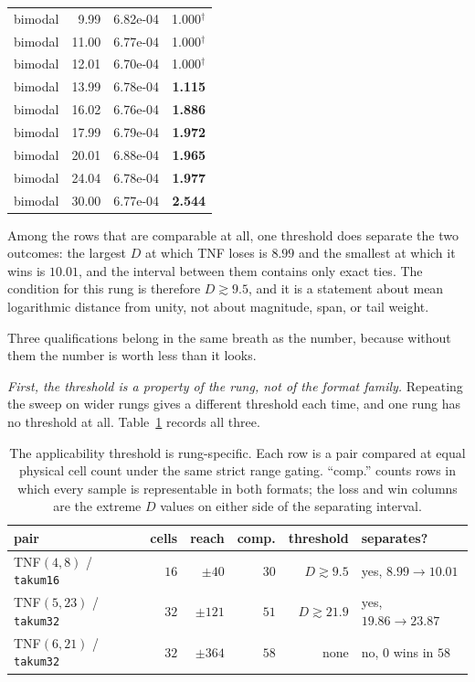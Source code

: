 \documentclass[11pt]{article}
\theoremstyle{definition}
\begin{document}
\begin{table}[htbp]
\begin{tabular}{lrrr}
bimodal & 9.99 & 6.82e-04 & 1.000$^{\dagger}$ \\
bimodal & 11.00 & 6.77e-04 & 1.000$^{\dagger}$ \\
bimodal & 12.01 & 6.70e-04 & 1.000$^{\dagger}$ \\
bimodal & 13.99 & 6.78e-04 & \textbf{1.115} \\
bimodal & 16.02 & 6.76e-04 & \textbf{1.886} \\
bimodal & 17.99 & 6.79e-04 & \textbf{1.972} \\
bimodal & 20.01 & 6.88e-04 & \textbf{1.965} \\
bimodal & 24.04 & 6.78e-04 & \textbf{1.977} \\
bimodal & 30.00 & 6.77e-04 & \textbf{2.544} \\
\hline
\end{tabular}
\end{table}

Among the rows that are comparable at all, one threshold does separate the two
outcomes: the largest $D$ at which TNF loses is $8.99$ and the smallest at which
it wins is $10.01$, and the interval between them contains only exact ties. The
condition for this rung is therefore $D \gtrsim 9.5$, and it is a statement about
mean logarithmic distance from unity, not about magnitude, span, or tail weight.

Three qualifications belong in the same breath as the number, because without
them the number is worth less than it looks.

\emph{First, the threshold is a property of the rung, not of the format family.}
Repeating the sweep on wider rungs gives a different threshold each time, and one
rung has no threshold at all. Table~\ref{tab:rungthr} records all three.

\begin{table}[htbp]\centering
\caption{The applicability threshold is rung-specific. Each row is a pair
compared at equal physical cell count under the same strict range gating. ``comp.''
counts rows in which every sample is representable in both formats; the loss and
win columns are the extreme $D$ values on either side of the separating interval.}
\label{tab:rungthr}
\begin{tabular}{lrrrrl}
\hline
pair & cells & reach & comp. & threshold & separates? \\
\hline
TNF$(4,8)$ / \texttt{takum16} & $16$ & $\pm 40$ & $30$ & $D \gtrsim 9.5$ & yes, $8.99 \to 10.01$ \\
TNF$(5,23)$ / \texttt{takum32} & $32$ & $\pm 121$ & $51$ & $D \gtrsim 21.9$ & yes, $19.86 \to 23.87$ \\
TNF$(6,21)$ / \texttt{takum32} & $32$ & $\pm 364$ & $58$ & none & no, $0$ wins in $58$ \\
\hline
\end{tabular}
\end{table}
\end{document}
